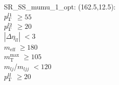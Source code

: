 SR\_SS\_mumu\_1\_opt: (162.5,12.5): \\
$p_{\text{T}}^{l1}$ $\geq 55$ \\
$p_{\text{T}}^{l2}$ $\geq 20$ \\
$|\Delta\eta_{ll}|$ $<3$ \\
$m_{\text{eff}}$ $\geq 180$ \\
$m_{\text{T}}^{\text{max}}$ $\geq 105$ \\
$m_{lj}$/$m_{ljj}$ $<120$ \\
$p_{\text{T}}^{ll}$ $\geq 20$ \\
